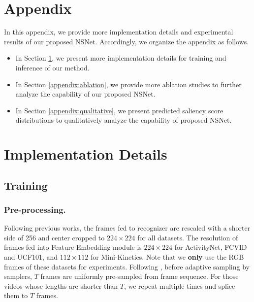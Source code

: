 \documentclass[runningheads]{llncs}
\begin{document}
\clearpage
\appendix
\section*{Appendix} \label{appendix}
\setcounter{table}{0}
In this appendix, we provide more implementation details and experimental results of our proposed NSNet. Accordingly, we organize the appendix as follows.

\begin{itemize}
    \item In Section \ref{appendix:imp}, we present more implementation details for training and inference of our method. 
    \item In Section \ref{appendix:ablation}, we provide more ablation studies to further analyze the capability of our proposed NSNet. 
    \item In Section \ref{appendix:qualitative}, we present predicted saliency score distributions to qualitatively analyze the capability of proposed NSNet.
\end{itemize}

\section{Implementation Details}\label{appendix:imp}
\subsection{Training}\label{appendix:train_details}
\subsubsection{Pre-processing.}
Following previous works, the frames fed to recognizer are rescaled with a shorter side of 256 and center cropped to $224\times224$ for all datasets. The resolution of frames fed into Feature Embedding module is $224\times224$ for ActivityNet, FCVID and UCF101, and $112\times112$ for Mini-Kinetics. Note that we \textbf{only} use the RGB frames of these datasets for experiments.
Following \cite{marl}, before adaptive sampling by samplers, $T$ frames are uniformly pre-sampled from frame sequence. For those videos whose lengths are shorter than $T$, we repeat multiple times and splice them to $T$ frames. 
\end{document}
